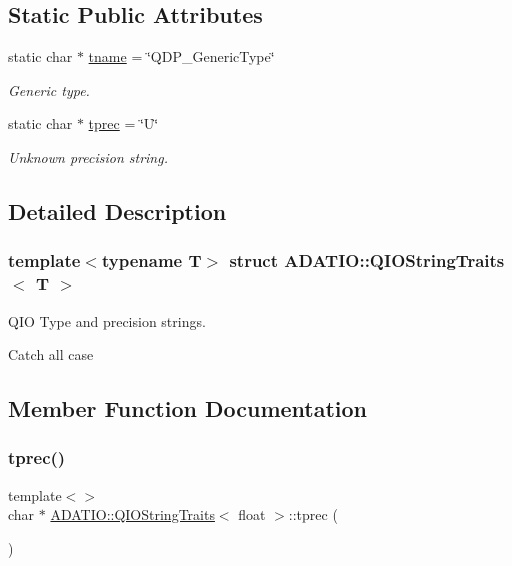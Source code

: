 \subsection*{Static Public Attributes}
\begin{DoxyCompactItemize}
\item 
static char $\ast$ \mbox{\hyperlink{group__qio_ga14189398447447c3ff6d039d05033619}{tname}} = \char`\"{}Q\+D\+P\+\_\+\+Generic\+Type\char`\"{}
\begin{DoxyCompactList}\small\item\em Generic type. \end{DoxyCompactList}\item 
static char $\ast$ \mbox{\hyperlink{group__qio_ga94d948248c229ef3f2935069425f550a}{tprec}} = \char`\"{}U\char`\"{}
\begin{DoxyCompactList}\small\item\em Unknown precision string. \end{DoxyCompactList}\end{DoxyCompactItemize}


\subsection{Detailed Description}
\subsubsection*{template$<$typename T$>$\newline
struct A\+D\+A\+T\+I\+O\+::\+Q\+I\+O\+String\+Traits$<$ T $>$}

Q\+IO Type and precision strings. 

Catch all case 

\subsection{Member Function Documentation}
\mbox{\label{structADATIO_1_1QIOStringTraits_ad88615f93dbc104e55a88d6d166c86dc}} 
\subsubsection{\texorpdfstring{tprec()}{tprec()}\hspace{0.1cm}{\footnotesize\ttfamily [1/6]}}
{\footnotesize\ttfamily template$<$$>$ \\
char $\ast$ \mbox{\hyperlink{structADATIO_1_1QIOStringTraits}{A\+D\+A\+T\+I\+O\+::\+Q\+I\+O\+String\+Traits}}$<$ float $>$\+::tprec (\begin{DoxyParamCaption}{ }\end{DoxyParamCaption})}

